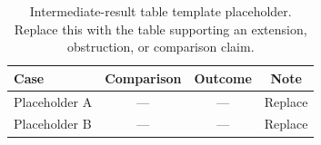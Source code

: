 \begin{table}[t]
\caption{Intermediate-result table template placeholder. Replace this with the
table supporting an extension, obstruction, or comparison claim.}
\label{tbl:table-template-intermediate-two}
\centering
\small
\begin{tabular}{@{}l c c c@{}}
\toprule
Case & Comparison & Outcome & Note \\
\midrule
Placeholder A & --- & --- & Replace \\
Placeholder B & --- & --- & Replace \\
\bottomrule
\end{tabular}
\end{table}
